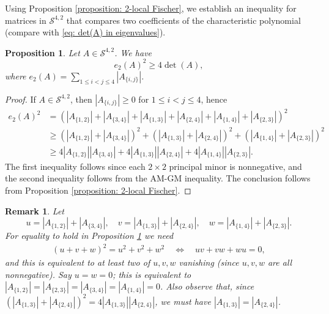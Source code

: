 \documentclass[reqno,hidelinks,11pt]{amsart}
\numberwithin{equation}{section}
\newtheorem{remark}[theorem]{Remark}
\newtheorem{proposition}[theorem]{Proposition}
\def\S{\mathcal{S}}
\begin{document}
Using Proposition \ref{proposition: 2-local Fischer}, we establish an inequality for matrices in $\S^{4,2}$ that compares two coefficients of the characteristic polynomial (compare with \eqref{eq: det(A) in eigenvalues}). 

\begin{proposition}\label{prop: e_2^2>=4det}
Let $A \in \S^{4, 2}$. We have
\[
e_2(A)^2\ge 4\det(A),
\]
where $e_2(A) = \sum_{1 \leq i < j \leq 4} |A_{\{i,j\}}|$.
\end{proposition}
\begin{proof} If $A\in\S^{4,2}$, then $|A_{\{i,j\}}|\ge0$ for $1\le i<j\le4$, hence
\begin{align*}
e_2(A)^2&=\left(|A_{\{1,2\}}|+|A_{\{3,4\}}|+|A_{\{1,3\}}|+|A_{\{2,4\}}|+|A_{\{1,4\}}|+|A_{\{2,3\}}|\right)^2\\
 &\ge \left(|A_{\{1,2\}}|+|A_{\{3,4\}}|\right)^2+\left(|A_{\{1,3\}}|+|A_{\{2,4\}}|\right)^2+\left(|A_{\{1,4\}}|+|A_{\{2,3\}}|\right)^2\\
 &\ge 4|A_{\{1,2\}}||A_{\{3,4\}}|+4|A_{\{1,3\}}||A_{\{2,4\}}|+4|A_{\{1,4\}}||A_{\{2,3\}}|.
\end{align*}
The first inequality follows since each $2\times 2$ principal minor is nonnegative, and the second inequality follows from the AM-GM inequality. The conclusion follows from Proposition \ref{proposition: 2-local Fischer}.
\end{proof}

\begin{remark}\label{rem: 4-cycle}
    Let 
    \[
    u=|A_{\{1,2\}}|+|A_{\{3,4\}}|, \quad v=|A_{\{1,3\}}|+|A_{\{2,4\}}|, \quad w=|A_{\{1,4\}}|+|A_{\{2,3\}}|.
    \]For equality to hold in Proposition \ref{prop: e_2^2>=4det} we need 
    \begin{align*}
    (u+v+w)^2=u^2+v^2+w^2 \quad\Leftrightarrow \quad uv+vw+wu=0,
    \end{align*}
     and this is equivalent to at least two of $u,v,w$ vanishing (since $u,v,w$ are all nonnegative). Say $u=w=0$; this is equivalent to $|A_{\{1,2\}}|=|A_{\{2,3\}}|=|A_{\{3,4\}}|=|A_{\{1,4\}}|=0$. Also observe that, since $(|A_{\{1,3\}}|+|A_{\{2,4\}}|)^2=4|A_{\{1,3\}}||A_{\{2,4\}}|$, we must have $|A_{\{1,3\}}|=|A_{\{2,4\}}|$.
\end{remark}
\end{document}
